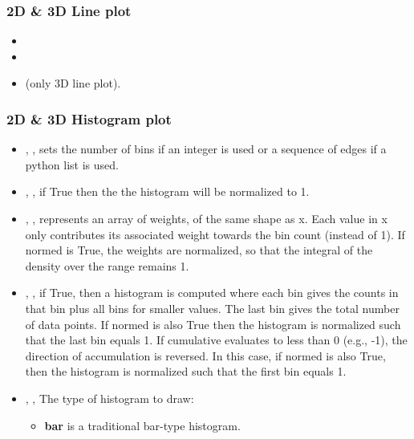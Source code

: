 \subsubsection{2D \& 3D Line plot}
  \begin{itemize}
    \item {}
    \item {}
    \item {} (only 3D line plot).
  \end{itemize}

\subsubsection{2D \& 3D Histogram plot}
\begin{itemize}
  \item {}, , sets
  the number of bins if an integer is used or a sequence of edges if a
  python list is used.
  \item {}, , if True then the
  the histogram will be normalized to 1.
  \item {}, , represents an
  array of weights, of the same shape as x.
  Each value in x only contributes its associated weight towards the bin count
  (instead of 1).
  If normed is True, the weights are normalized, so that the integral of the
  density over the range remains 1.
  \item {}, , if True, then a
  histogram is computed where each bin gives the counts in that bin plus all
  bins for smaller values.
  The last bin gives the total number of data points.
  If normed is also True then the histogram is normalized such that the last bin
  equals 1.
  If cumulative evaluates to less than 0 (e.g., -1), the direction of
  accumulation is reversed.
  In this case, if normed is also True, then the histogram is normalized such
  that the first bin equals 1.
  \item {}, ,
  The type of histogram to draw:
  \begin{itemize}
    \item \textbf{bar} is a traditional bar-type histogram.

\end{itemize}
\end{itemize}
